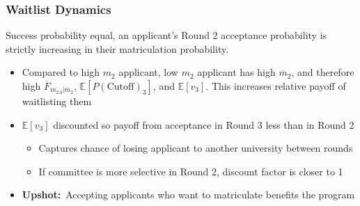 \documentclass[12pt, aspectratio=169]{beamer}
\begin{document}
\begin{frame}[label=wd]
\frametitle{Waitlist Dynamics}
\begin{theorem}
Success probability equal, an applicant's Round 2 acceptance probability is strictly increasing in their matriculation probability.
\end{theorem}
\vspace{10pt}
\begin{itemize}
\item Compared to high $m_2$ applicant, low $m_2$ applicant has high $\ddot{m_2}$, and therefore high $\overline{F}_{\overline{m_{2A}}|\ddot{m_2}}$, $\mathbb{E}[P(\text{Cutoff})_3]$, and $\mathbb{E}[v_3]$. This increases relative payoff of waitlisting them\!
\vspace{10pt}
\item $\mathbb{E}[v_3]$ discounted so payoff from acceptance in Round 3 less than in Round 2
\vspace{5pt}
\begin{itemize}
\item Captures chance of losing applicant to another university between rounds
\vspace{5pt}
\item If committee is more selective in Round 2, discount factor is closer to 1
\vspace{10pt}
\end{itemize}
\item[$\bigstar$] \textbf{Upshot:}\ Accepting applicants who want to matriculate benefits the program
\vspace{10pt}
\end{itemize}
\hyperlink{wm1}{} \hyperlink{wn}{}
\end{frame}

\end{document}
